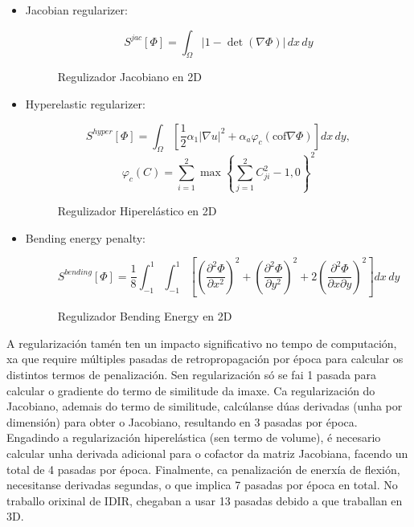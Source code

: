  \begin{itemize}
    \item Jacobian regularizer:
    \begin{figure}[tbp]
        \centering
        \[
        S^{jac}[\Phi] = \int_{\Omega} \left| 1 - \det \left( \nabla \Phi \right) \right| \, dx \, dy
        \]
        \caption{Regulizador Jacobiano en 2D}
    \end{figure}
    
    \item Hyperelastic regularizer:
    \begin{figure}[tbp]
        \centering
        \[
        S^{hyper}[\Phi] = \int_{\Omega} \left[ \frac{1}{2} \alpha_1 |\nabla u|^2 + \alpha_a \varphi_c (\text{cof} \nabla \Phi) \right] dx \, dy,
        \]
        \[
        \varphi_c(C) = \sum_{i=1}^2 \max \left\{ \sum_{j=1}^2 C_{ji}^2 - 1, 0 \right\}^2
        \]
        \caption{Regulizador Hiperelástico en 2D}
    \end{figure}
    
    \item Bending energy penalty:
    \begin{figure}[tbp]
        \centering
        \[
        S^{bending}[\Phi] = \frac{1}{8} \int_{-1}^{1} \int_{-1}^{1} \left[ \left( \frac{\partial^2 \Phi}{\partial x^2} \right)^2 + \left( \frac{\partial^2 \Phi}{\partial y^2} \right)^2 + 2 \left( \frac{\partial^2 \Phi}{\partial x \partial y} \right)^2 \right] dx \, dy
        \]
        \caption{Regulizador Bending Energy en 2D}
    \end{figure}
    
\end{itemize}

A regularización tamén ten un impacto significativo no tempo de computación, xa que require múltiples pasadas de retropropagación por época para calcular os distintos termos de penalización.
Sen regularización só se fai 1 pasada para calcular o gradiente do termo de similitude da imaxe.
Ca regularización do Jacobiano, ademais do termo de similitude, calcúlanse dúas derivadas (unha por dimensión) para obter o Jacobiano, resultando en 3 pasadas por época.
Engadindo a regularización hiperelástica (sen termo de volume), é necesario calcular unha derivada adicional para o cofactor da matriz Jacobiana, facendo un total de 4 pasadas por época.
Finalmente, ca penalización de enerxía de flexión, necesitanse derivadas segundas, o que implica 7 pasadas por época en total.
No traballo orixinal de IDIR, chegaban a usar 13 pasadas debido a que traballan en 3D.

